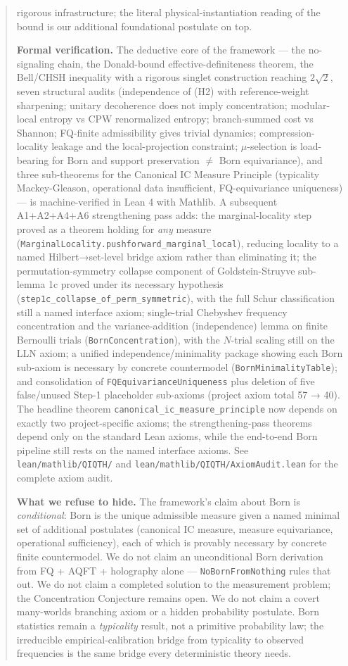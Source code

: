 \documentclass[11pt,a4paper]{article}
\begin{document}
\begin{abstract}
rigorous infrastructure; the literal physical-instantiation reading of the bound is our additional foundational postulate on top.

\textbf{Formal verification.} The deductive core of the framework — the no-signaling chain, the Donald-bound effective-definiteness theorem, the Bell/CHSH inequality with a rigorous singlet construction reaching $2\sqrt{2}$, seven structural audits (independence of (H2) with reference-weight sharpening; unitary decoherence does not imply concentration; modular-local entropy vs CPW renormalized entropy; branch-summed cost vs Shannon; FQ-finite admissibility gives trivial dynamics; compression-locality leakage and the local-projection constraint; $\mu$-selection is load-bearing for Born and support preservation $\neq$ Born equivariance), and three sub-theorems for the Canonical IC Measure Principle (typicality Mackey-Gleason, operational data insufficient, FQ-equivariance uniqueness) — is machine-verified in Lean 4 with Mathlib. A subsequent A1+A2+A4+A6 strengthening pass adds: the marginal-locality step proved as a theorem holding for \emph{any} measure (\texttt{MarginalLocality.pushforward\_marginal\_local}), reducing locality to a named Hilbert→set-level bridge axiom rather than eliminating it; the permutation-symmetry collapse component of Goldstein-Struyve sub-lemma 1c proved under its necessary hypothesis (\texttt{step1c\_collapse\_of\_perm\_symmetric}), with the full Schur classification still a named interface axiom; single-trial Chebyshev frequency concentration and the variance-addition (independence) lemma on finite Bernoulli trials (\texttt{BornConcentration}), with the $N$-trial scaling still on the LLN axiom; a unified independence/minimality package showing each Born sub-axiom is necessary by concrete countermodel (\texttt{BornMinimalityTable}); and consolidation of \texttt{FQEquivarianceUniqueness} plus deletion of five false/unused Step-1 placeholder sub-axioms (project axiom total 57 → 40). The headline theorem \texttt{canonical\_ic\_measure\_principle} now depends on exactly two project-specific axioms; the strengthening-pass theorems depend only on the standard Lean axioms, while the end-to-end Born pipeline still rests on the named interface axioms. See \texttt{lean/mathlib/QIQTH/} and \texttt{lean/mathlib/QIQTH/AxiomAudit.lean} for the complete axiom audit.

\textbf{What we refuse to hide.} The framework's claim about Born is \emph{conditional}: Born is the unique admissible measure given a named minimal set of additional postulates (canonical IC measure, measure equivariance, operational sufficiency), each of which is provably necessary by concrete finite countermodel. We do not claim an unconditional Born derivation from FQ + AQFT + holography alone — \texttt{NoBornFromNothing} rules that out. We do not claim a completed solution to the measurement problem; the Concentration Conjecture remains open. We do not claim a covert many-worlds branching axiom or a hidden probability postulate. Born statistics remain a \emph{typicality} result, not a primitive probability law; the irreducible empirical-calibration bridge from typicality to observed frequencies is the same bridge every deterministic theory needs.


\end{abstract}
\end{document}
